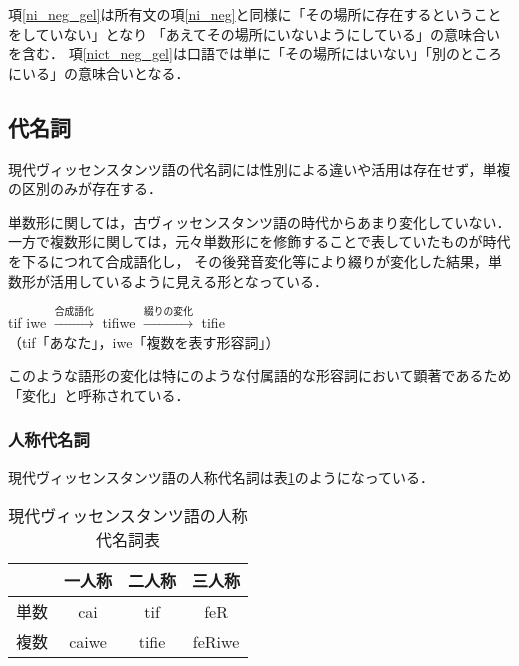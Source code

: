 \documentclass[a4paper,xelatex,ja=standard]{bxjsarticle}
\begin{document}
項\ref{ni_neg_gel}は所有文の項\ref{ni_neg}と同様に「その場所に存在するということをしていない」となり
「あえてその場所にいないようにしている」の意味合いを含む．
項\ref{nict_neg_gel}は口語では単に「その場所にはいない」「別のところにいる」の意味合いとなる．

\subsection{代名詞}
現代ヴィッセンスタンツ語の代名詞には性別による違いや活用は存在せず，単複の区別のみが存在する．

単数形に関しては，古ヴィッセンスタンツ語の時代からあまり変化していない．
一方で複数形に関しては，元々単数形にを修飾することで表していたものが時代を下るにつれて合成語化し，
その後発音変化等により綴りが変化した結果，単数形が活用しているように見える形となっている．
\begin{screen}
 \begin{center}
  \begin{liparxecc}
   tif iwe $\xrightarrow{\text{合成語化}}$ tifiwe $\xrightarrow{\text{綴りの変化}}$ tifie \\
   （tif「あなた」，iwe「複数を表す形容詞」）
  \end{liparxecc}
 \end{center}
\end{screen}
このような語形の変化は特にのような付属語的な形容詞において顕著であるため「変化」と呼称されている．

\subsubsection{人称代名詞}
現代ヴィッセンスタンツ語の人称代名詞は表\ref{vic_human_pronoum}のようになっている．
\begin{table}[htbp]
 \caption{現代ヴィッセンスタンツ語の人称代名詞表}
 \label{vic_human_pronoum}
 \begin{center}
  \begin{liparxecc}
   \begin{tabular}{|c||c|c|c|} \hline
    & 一人称 & 二人称 & 三人称 \\ \hline \hline
    単数 & cai & tif & feR \\ \hline
    複数 & caiwe & tifie & feRiwe \\ \hline
   \end{tabular}
  \end{liparxecc} 
 \end{center}
\end{table}
\end{document}
